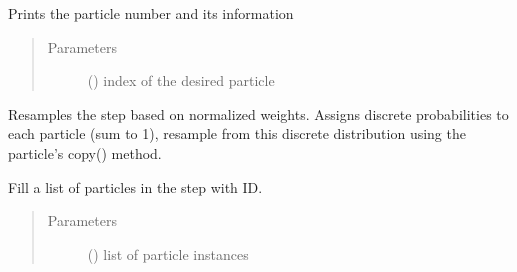 \documentclass[letterpaper,10pt,english]{sphinxmanual}
\begin{document}
\begin{fulllineitems}
\begin{fulllineitems}
\end{fulllineitems}


\begin{fulllineitems}
\label{\detokenize{source_code:smcpy.smc.smc_step.SMCStep.print_particle_info}}
Prints the particle number and its information
\begin{quote}\begin{description}
\item[{Parameters}] \leavevmode
{} () \textendash{} index of the desired particle

\end{description}\end{quote}

\end{fulllineitems}


\begin{fulllineitems}
\label{\detokenize{source_code:smcpy.smc.smc_step.SMCStep.resample}}
Resamples the step based on normalized weights. Assigns discrete
probabilities to each particle (sum to 1), resample from this discrete distribution using the particle’s copy() method.

\end{fulllineitems}


\begin{fulllineitems}
\label{\detokenize{source_code:smcpy.smc.smc_step.SMCStep.set_particles}}
Fill a list of particles in the step with ID.
\begin{quote}\begin{description}
\item[{Parameters}] \leavevmode
{} () \textendash{} list of particle instances

\end{description}\end{quote}

\end{fulllineitems}


\end{fulllineitems}
\end{document}
